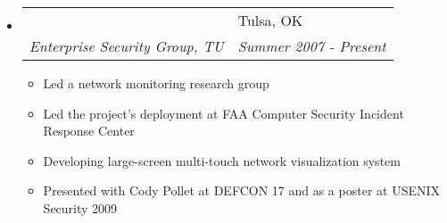 \documentclass[letterpaper,11pt]{article}
\makeatletter
\newcommand{\resitem}[1]{\item \parbox[t]{4.6in}{#1} \vspace{-2pt}}
\newcommand{\ressubheading}[4]{
\begin{tabular*}{6.5in}[t]{l@{\extracolsep{\fill}}l}
		\textbf{\parbox[t]{4.5in}{\raggedright #1 }} & \parbox[b]{1.5in}{#2} \\
		\textit{#3} & \textit{#4} \\
\end{tabular*}\vspace{-6pt}}
\makeatother
\begin{document}
\begin{itemize}
\item
	\ressubheading{SAND/DVNE}{Tulsa, OK}{Enterprise Security Group, TU}{Summer 2007 - Present}
	\begin{itemize}
		\resitem{Led a network monitoring research group}
		\resitem{Led the project's deployment at FAA Computer Security Incident Response Center}
		\resitem{Developing large-screen multi-touch network visualization system}
		\resitem{Presented with Cody Pollet at DEFCON 17 and as a poster at USENIX Security 2009}
	\end{itemize}
\end{itemize}
\end{document}
